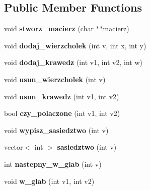 \subsection*{\-Public \-Member \-Functions}
\begin{DoxyCompactItemize}
\item 
\hypertarget{classgraf_a2118758218625a70d32dcf01044df4ea}{void {\bfseries stworz\-\_\-macierz} (char $\ast$$\ast$macierz)}\label{classgraf_a2118758218625a70d32dcf01044df4ea}

\item 
\hypertarget{classgraf_a9fc141599c22f17b0e78b0e69ef0030c}{void {\bfseries dodaj\-\_\-wierzcholek} (int v, int x, int y)}\label{classgraf_a9fc141599c22f17b0e78b0e69ef0030c}

\item 
\hypertarget{classgraf_adc5aa4ebf7a250bdc26e082d8e529acf}{void {\bfseries dodaj\-\_\-krawedz} (int v1, int v2, int w)}\label{classgraf_adc5aa4ebf7a250bdc26e082d8e529acf}

\item 
\hypertarget{classgraf_abe0ff8a414e519b22d80a637b6a1b7b9}{void {\bfseries usun\-\_\-wierzcholek} (int v)}\label{classgraf_abe0ff8a414e519b22d80a637b6a1b7b9}

\item 
\hypertarget{classgraf_a098650e7621b94ecff5e6be866b15b3f}{void {\bfseries usun\-\_\-krawedz} (int v1, int v2)}\label{classgraf_a098650e7621b94ecff5e6be866b15b3f}

\item 
\hypertarget{classgraf_af6698c3f84ab5523ecd862c67d12500c}{bool {\bfseries czy\-\_\-polaczone} (int v1, int v2)}\label{classgraf_af6698c3f84ab5523ecd862c67d12500c}

\item 
\hypertarget{classgraf_a4c8edf16b06f737e6406afd8b78a3ce5}{void {\bfseries wypisz\-\_\-sasiedztwo} (int v)}\label{classgraf_a4c8edf16b06f737e6406afd8b78a3ce5}

\item 
\hypertarget{classgraf_a9a262c82b6c019e45cc273b1d24b88a0}{vector$<$ int $>$ {\bfseries sasiedztwo} (int v)}\label{classgraf_a9a262c82b6c019e45cc273b1d24b88a0}

\item 
\hypertarget{classgraf_a02a49e16cb914a0e1156f61536a75b3a}{int {\bfseries nastepny\-\_\-w\-\_\-glab} (int v)}\label{classgraf_a02a49e16cb914a0e1156f61536a75b3a}

\item 
\hypertarget{classgraf_a7d2f807964ecedb5bc8e731a81e86946}{void {\bfseries w\-\_\-glab} (int v1, int v2)}\label{classgraf_a7d2f807964ecedb5bc8e731a81e86946}


\end{DoxyCompactItemize}
